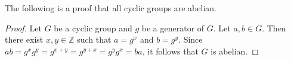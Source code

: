 \documentclass[12pt]{article}
\begin{document}
The following is a proof that all cyclic groups are abelian.

\begin{proof}
Let $G$ be a cyclic group and $g$ be a generator of $G$.  Let $a,b \in G$.  Then there exist $x,y \in {\mathbb Z}$ such that $a=g^x$ and $b=g^y$.  Since $ab=g^xg^y=g^{x+y}=g^{y+x}=g^yg^x=ba$, it follows that $G$ is abelian.
\end{proof}
\end{document}
